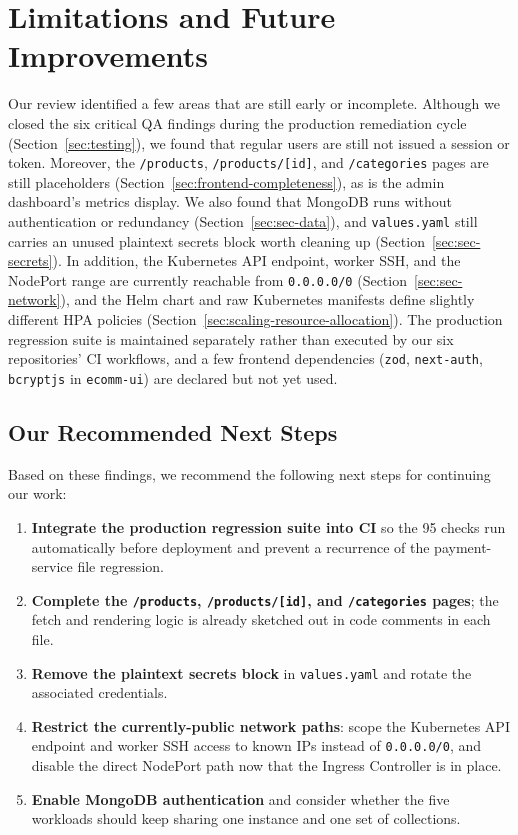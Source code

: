 \chapter{Limitations and Future Improvements}\label{chap:limitations}

\begin{warningbox}
Our review identified a few areas that are still early or incomplete. Although we
closed the six critical QA findings during the production remediation cycle
(Section~\ref{sec:testing}), we found that regular users are still not issued a
session or token. Moreover, the \texttt{/products}, \texttt{/products/[id]},
and \texttt{/categories} pages are still placeholders
(Section~\ref{sec:frontend-completeness}), as is the admin dashboard's metrics
display. We also found that MongoDB runs without authentication or redundancy
(Section~\ref{sec:sec-data}), and \texttt{values.yaml} still carries an unused
plaintext secrets block worth cleaning up (Section~\ref{sec:sec-secrets}). In
addition, the Kubernetes API endpoint, worker SSH, and the NodePort range are currently
reachable from \texttt{0.0.0.0/0} (Section~\ref{sec:sec-network}), and the Helm
chart and raw Kubernetes manifests define slightly different HPA policies
(Section~\ref{sec:scaling-resource-allocation}). The production regression suite
is maintained separately rather than executed by our six repositories' CI
workflows, and a few frontend dependencies (\texttt{zod},
\texttt{next-auth}, \texttt{bcryptjs} in \texttt{ecomm-ui}) are declared but not
yet used.
\end{warningbox}

\section{Our Recommended Next Steps}\label{sec:recommended-actions}
Based on these findings, we recommend the following next steps for continuing our
work:
\begin{enumerate}[leftmargin=1.4em]
  \item \textbf{Integrate the production regression suite into CI} so the 95
        checks run automatically before deployment and prevent a recurrence of
        the payment-service file regression.
  \item \textbf{Complete the \texttt{/products}, \texttt{/products/[id]}, and
        \texttt{/categories} pages}; the fetch and rendering logic is already
        sketched out in code comments in each file.
  \item \textbf{Remove the plaintext secrets block} in \texttt{values.yaml} and
        rotate the associated credentials.
  \item \textbf{Restrict the currently-public network paths}: scope the Kubernetes
        API endpoint and worker SSH access to known IPs instead of
        \texttt{0.0.0.0/0}, and disable the direct NodePort path now that the
        Ingress Controller is in place.
  \item \textbf{Enable MongoDB authentication} and consider whether the five
        workloads should keep sharing one instance and one set of collections.
\end{enumerate}
